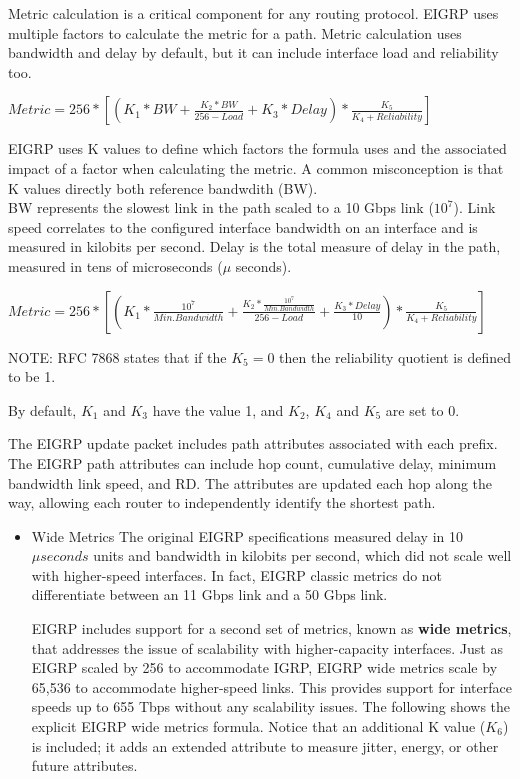 \documentclass{article}
\begin{document}
\begin{itemize}
		Metric calculation is a critical component for any routing protocol. EIGRP uses multiple factors to calculate the metric for a path. Metric calculation uses bandwidth and delay by default, but it can include interface load and reliability too.\\

		\begin{center}
			$Metric = 256 * [(K_1 * BW + \frac{K_2 * BW}{256 - Load} + K_3 * Delay) * \frac{K_5}{K_4 + Reliability}]$	
		\end{center}

		EIGRP uses K values to define which factors the formula uses and the associated impact of a factor when calculating the metric. A common misconception is that K values directly both reference bandwdith (BW).\\

		BW represents the slowest link in the path scaled to a 10 Gbps link ($10^7$). Link speed correlates to the configured interface bandwidth on an interface and is measured in kilobits per second. Delay is the total measure of delay in the path, measured in tens of microseconds ($\mu$ seconds).

		\begin{center}
			$Metric = 256 * [(K_1 * \frac{10^7}{Min. Bandwidth} + \frac{K_2 * \frac{10^7}{Min. Bandwidth}}{256 - Load} + \frac{K_3 * Delay}{10}) * \frac{K_5}{K_4 + Reliability}]$	
		\end{center}

		NOTE: RFC 7868 states that if the $K_5=0$ then the reliability quotient is defined to be 1.

		By default, $K_1$ and $K_3$ have the value 1, and $K_2$, $K_4$ and $K_5$ are set to 0.

		The EIGRP update packet includes path attributes associated with each prefix. The EIGRP path attributes can include hop count, cumulative delay, minimum bandwidth link speed, and RD. The attributes are updated each hop along the way, allowing each router to independently identify the shortest path.

		\begin{itemize}
			\item Wide Metrics
				The original EIGRP specifications measured delay in 10 $\mu seconds$ units and bandwidth in kilobits per second, which did not scale well with higher-speed interfaces. In fact, EIGRP classic metrics do not differentiate between an 11 Gbps link and a 50 Gbps link.

				EIGRP includes support for a second set of metrics, known as \textbf{wide metrics}, that addresses the issue of scalability with higher-capacity interfaces. Just as EIGRP scaled by 256 to accommodate IGRP, EIGRP wide metrics scale by 65,536 to accommodate higher-speed links. This provides support for interface speeds up to 655 Tbps without any scalability issues. The following shows the explicit EIGRP wide metrics formula. Notice that an additional K value ($K_6$) is included; it adds an extended attribute to measure jitter, energy, or other future attributes.


\end{itemize}
\end{itemize}
\end{document}
